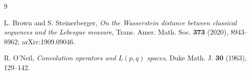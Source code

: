 \documentclass[11pt]{amsart}
\begin{document}
\begin{thebibliography}{9}

L. Brown and S. Steinerberger,
\emph{On the Wasserstein distance between classical sequences and the
Lebesgue measure},
Trans. Amer. Math. Soc. \textbf{373} (2020), 8943--8962;
arXiv:1909.09046.

R. O'Neil,
\emph{Convolution operators and $L(p,q)$ spaces},
Duke Math. J. \textbf{30} (1963), 129--142.

\end{thebibliography}
\end{document}
